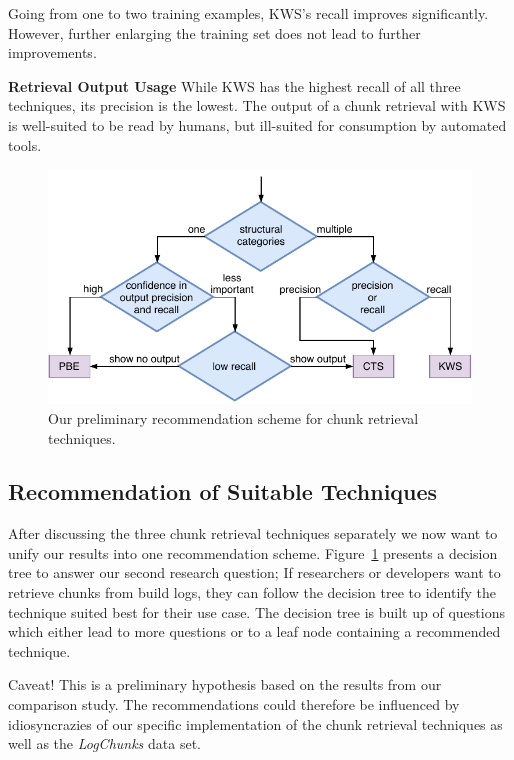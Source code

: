 Going from one to two training examples, KWS's recall improves
significantly.
However, further enlarging the training set
does not lead to further improvements.

\noindent
\textbf{Retrieval Output Usage}
While KWS has the highest recall of all three techniques, its
precision is the lowest.
The output of a chunk retrieval with KWS is
well-suited to be read by humans, but ill-suited for consumption by
automated tools.

\begin{figure}[tb]
		\centering
		\includegraphics[width=\columnwidth,
		clip]{img/crt-recommendation.pdf}
		\caption{Our preliminary recommendation scheme for chunk
		retrieval techniques.}
		\label{fig:crt-recommendation}
\end{figure}

\subsection{Recommendation of Suitable Techniques}
After discussing the three chunk retrieval techniques separately we
now want to unify our results into one recommendation scheme.
Figure~\ref{fig:crt-recommendation} presents a decision tree
to answer our second research question;
If researchers or developers want to retrieve chunks from build logs,
they can follow the decision tree to identify the technique
suited best for their use case.
The decision tree is built up of questions
which either lead to more questions or to a leaf node containing a
recommended technique.

\begin{simplebox}[minipage boxed title*=-7cm]{Caveat!}
This is a preliminary hypothesis based on the results
from our comparison study.
The recommendations could therefore be
influenced by idiosyncrazies of our specific implementation of the
chunk retrieval techniques as well as the \emph{LogChunks}
data set.
\end{simplebox}

